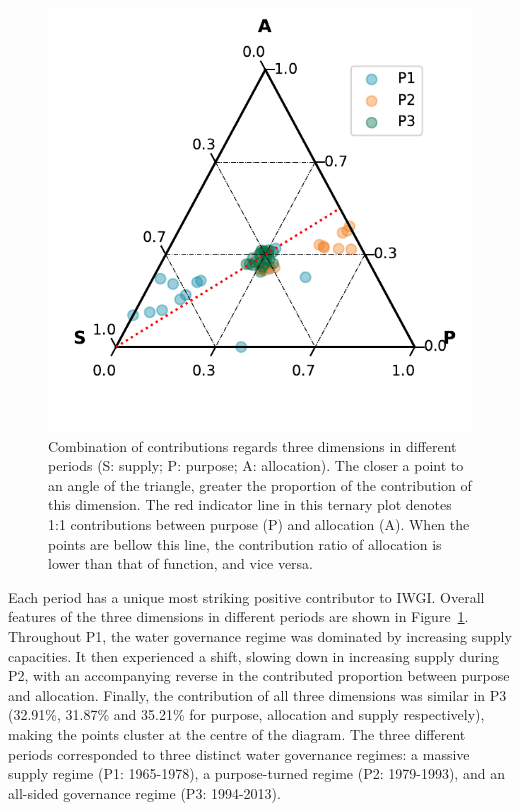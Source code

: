 \documentclass[9pt, twocolumn, twoside, lineno]{pnas-new}
\begin{document}
\begin{figure}[!htbp]
	\centering
	\includegraphics[width=0.9\linewidth]{../../figures/main/phases.pdf}
	\caption{Combination of contributions regards three dimensions in different periods (S: supply; P: purpose; A: allocation). The closer a point to an angle of the triangle, greater the proportion of the contribution of this dimension.
	The red indicator line in this ternary plot denotes 1:1 contributions between purpose (P) and allocation (A). When the points are bellow this line, the contribution ratio of allocation is lower than that of function, and vice versa.}
	\label{fig:phases}
\end{figure}

Each period has a unique most striking positive contributor to IWGI. Overall features of the three dimensions in different periods are shown in Figure~\ref{fig:phases}.
Throughout P1, the water governance regime was dominated by increasing supply capacities. 
It then experienced a shift, slowing down in increasing supply during P2, with an accompanying reverse in the contributed proportion between purpose and allocation. Finally, the contribution of all three dimensions was similar in P3 (32.91\%, 31.87\% and 35.21\% for purpose, allocation and supply respectively), making the points cluster at the centre of the diagram. 
The three different periods corresponded to three distinct water governance regimes: a massive supply regime (P1: 1965-1978), a purpose-turned regime (P2: 1979-1993), and an all-sided governance regime (P3: 1994-2013). 
\end{document}

